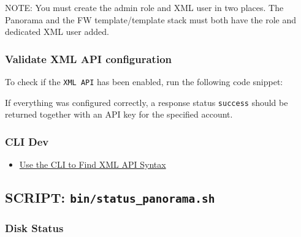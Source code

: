 \documentclass[
]{article}
\newenvironment{Shaded}{}{}
\newcommand{\ExtensionTok}[1]{#1}
\newcommand{\NormalTok}[1]{#1}
\newcommand{\StringTok}[1]{\textcolor[rgb]{0.25,0.44,0.63}{#1}}
\providecommand{\tightlist}{%
  \setlength{\itemsep}{0pt}\setlength{\parskip}{0pt}}
\begin{document}
NOTE: You must create the admin role and XML user in two places. The
Panorama and the FW template/template stack must both have the role and
dedicated XML user added.

\hypertarget{validate-xml-api-configuration}{%
\subsubsection{Validate XML API
configuration}\label{validate-xml-api-configuration}}

To check if the \texttt{XML\ API} has been enabled, run the following
code snippet:

\begin{Shaded}
\end{Shaded}

If everything was configured correctly, a response status
\texttt{success} should be returned together with an API key for the
specified account.

\hypertarget{cli-dev}{%
\subsubsection{CLI Dev}\label{cli-dev}}

\begin{itemize}
\tightlist
\item
  \href{https://docs.paloaltonetworks.com/pan-os/11-0/pan-os-panorama-api/get-started-with-the-pan-os-xml-api/explore-the-api/use-the-cli-to-find-xml-api-syntax}{Use
  the CLI to Find XML API Syntax}
\end{itemize}

\hypertarget{script-binstatus_panorama.sh}{%
\subsection{\texorpdfstring{SCRIPT:
\texttt{bin/status\_panorama.sh}}{SCRIPT: bin/status\_panorama.sh}}\label{script-binstatus_panorama.sh}}

\hypertarget{disk-status}{%
\subsubsection{Disk Status}\label{disk-status}}
\end{document}
